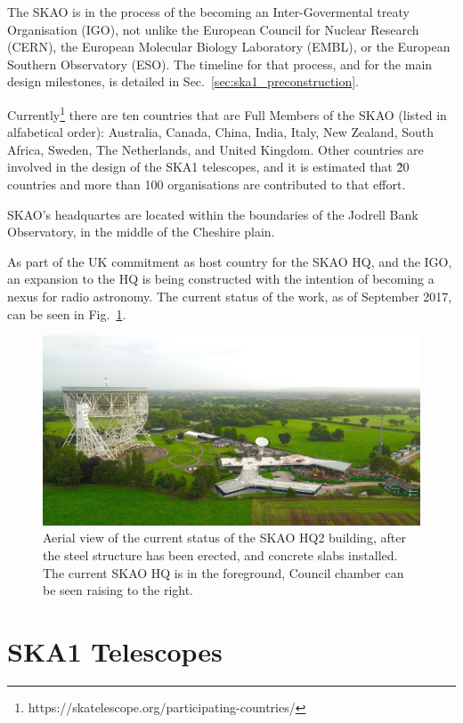 \documentclass[a4paper,
               biblatex,       %
               keeplastbox,    %
               ]{jacow-2_1}    %
\begin{document}
The SKAO is in the process of the becoming an Inter-Govermental treaty Organisation (IGO), not unlike the European Council for Nuclear Research (CERN), the European Molecular Biology Laboratory (EMBL), or the European Southern Observatory (ESO). The timeline for that process, and for the main design milestones, is detailed in Sec.~\ref{sec:ska1_preconstruction}.

Currently\footnote{https://skatelescope.org/participating-countries/} there are ten countries that are Full Members of the SKAO (listed in alfabetical order): Australia, Canada, China, India, Italy, New Zealand, South Africa, Sweden, The Netherlands, and United Kingdom. Other countries are involved in the design of the SKA1 telescopes, and it is estimated that \~20 countries and more than 100 organisations are contributed to that effort.

SKAO's headquartes are located within the boundaries of the Jodrell Bank Observatory, in the middle of the Cheshire plain.

As part of the UK commitment as host country for the SKAO HQ, and the IGO, an expansion to the HQ is being constructed with the intention of becoming a nexus for radio astronomy. The current status of the work, as of September 2017, can be seen in Fig.~\ref{fig:SKA-HQ2-aerial}.

\begin{figure}[!tb]
  \centering
    \includegraphics[width=\columnwidth]{FRAPL01f1}
  \caption{Aerial view of the current status of the SKAO HQ2 building, after the steel structure has been erected, and concrete slabs installed. The current SKAO HQ is in the foreground, Council chamber can be seen raising to the right.}
  \label{fig:SKA-HQ2-aerial}
\end{figure}


\section{SKA1 Telescopes} %
\label{sec:ska1_telescopes}
\end{document}
